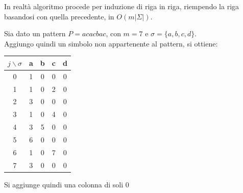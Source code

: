 \documentclass[a4paper,12pt, oneside]{book}
\begin{document}
In realtà algoritmo procede per induzione di riga in riga, riempendo la riga
basandosi con quella precedente, in $O(m|\Sigma|)$.\\
\newpage
\begin{esempio}
  Sia dato un pattern $P=acacbac$, con $m=7$ e $\sigma=\{a,b,c,d\}$.\\
  Aggiungo quindi un simbolo non appartenente al pattern, si ottiene:
   \begin{table}[H]
    \centering
    \begin{tabular}[H]{c||c|c|c|c}
      $j\backslash\sigma$ & a & b & c & d\\
      \hline
      \hline
      0 & 1 & 0 & 0 & 0\\
      1 & 1 & 0 & 2 & 0\\
      2 & 3 & 0 & 0 & 0\\
      3 & 1 & 0 & 4 & 0\\
      4 & 3 & 5 & 0 & 0\\ 
      5 & 6 & 0 & 0 & 0\\
      6 & 1 & 0 & 7 & 0\\
      7 & 3 & 0 & 0 & 0      
    \end{tabular}
  \end{table}
  Si aggiunge quindi una colonna di soli 0
\end{esempio}
\end{document}
